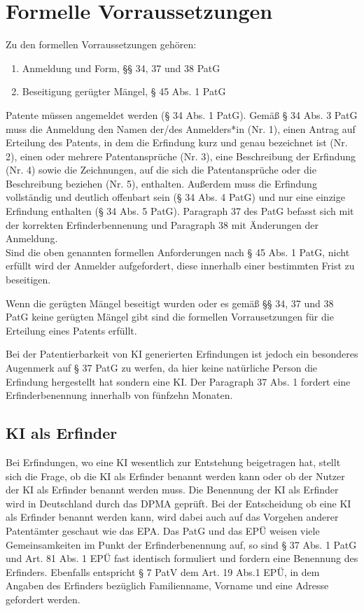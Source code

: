\section{Formelle Vorraussetzungen}

Zu den formellen Vorraussetzungen gehören:
\begin{enumerate}
    \item Anmeldung und Form, §§ 34, 37 und 38 PatG 
    \vspace{-0.11in} 
    \item Beseitigung gerügter Mängel, § 45 Abs. 1 PatG
\end{enumerate}

Patente müssen angemeldet werden (§ 34 Abs. 1 PatG). 
Gemäß § 34 Abs. 3 PatG muss die Anmeldung den Namen der/des Anmelders*in 
(Nr. 1), einen Antrag auf Erteilung des Patents, 
in dem die Erfindung kurz und genau bezeichnet ist (Nr. 2), 
einen oder mehrere Patentansprüche (Nr. 3), 
eine Beschreibung der Erfindung (Nr. 4) sowie die Zeichnungen, 
auf die sich die Patentansprüche oder die Beschreibung beziehen (Nr. 5), 
enthalten. 
Außerdem muss die Erfindung vollständig und deutlich offenbart sein (§ 34 Abs. 4 PatG) 
und nur eine einzige Erfindung enthalten (§ 34 Abs. 5 PatG). 
Paragraph 37 des PatG befasst sich mit der korrekten Erfinderbennenung 
und Paragraph 38 mit Änderungen der Anmeldung. 
\\

Sind die oben genannten formellen Anforderungen nach § 45 Abs. 1 PatG, 
nicht erfüllt wird der Anmelder aufgefordert, 
diese innerhalb einer bestimmten Frist zu beseitigen.

Wenn die gerügten Mängel beseitigt wurden 
oder es gemäß §§ 34, 37 und 38 PatG keine gerügten Mängel gibt 
sind die formellen Vorrausetzungen für die Erteilung eines Patents erfüllt.

Bei der Patentierbarkeit von KI generierten Erfindungen ist jedoch 
ein besonderes Augenmerk
auf § 37 PatG zu werfen, da hier keine natürliche Person
die Erfindung hergestellt hat sondern eine KI. 
Der Paragraph 37 Abs. 1 fordert eine Erfinderbenennung
innerhalb von fünfzehn Monaten.

\subsection{KI als Erfinder}
Bei Erfindungen, wo eine KI wesentlich
zur Entstehung beigetragen hat, stellt sich die Frage,
ob die KI als Erfinder benannt werden kann oder
ob der Nutzer der KI als Erfinder benannt werden muss.
Die Benennung der KI als Erfinder wird in Deutschland 
durch das DPMA geprüft. Bei der Entscheidung
ob eine KI als Erfinder benannt werden kann,
wird dabei auch auf das Vorgehen anderer 
Patentämter geschaut wie das EPA. 
Das PatG und das EPÜ weisen viele Gemeinsamkeiten
im Punkt der Erfinderbenennung auf, so sind 
§ 37 Abs. 1 PatG und 
Art. 81 Abs. 1 EPÜ fast identisch formuliert und 
fordern eine Benennung des Erfinders.
Ebenfalls entspricht § 7 PatV dem 
Art. 19 Abs.1 EPÜ, in dem Angaben des Erfinders
bezüglich Familienname, Vorname und eine Adresse gefordert 
werden. 

